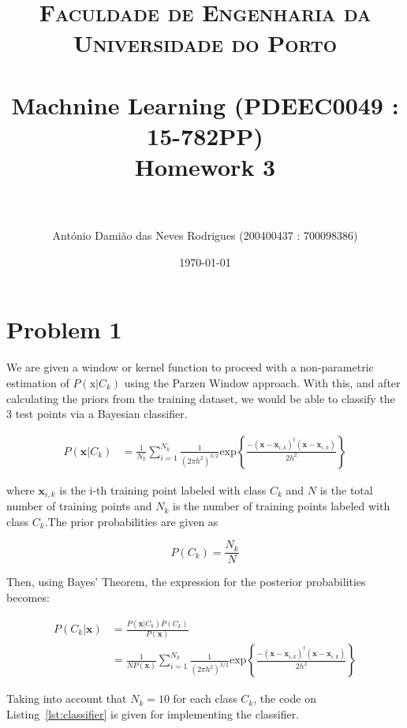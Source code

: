 \documentclass[paper=a4, fontsize=11pt]{scrartcl} %
\title{	
\normalfont \normalsize 
\textsc{Faculdade de Engenharia da Universidade do Porto} \\ [25pt] %
\horrule{0.5pt} \\[0.4cm] %
\LARGE Machnine Learning (PDEEC0049 : 15-782PP)\\ \Large Homework 3 \\ %
\horrule{2pt} \\[0.5cm] %
}
\author{António Damião das Neves Rodrigues (200400437 : 700098386)} %
\date{\normalsize\today} %
\numberwithin{equation}{section} %
\numberwithin{figure}{section} %
\numberwithin{table}{section} %
\newcommand{\vertbreak}{\vspace{1.75 mm}}
\begin{document}
\maketitle %

\section{Problem 1}

We are given a window or kernel function to proceed with a non-parametric 
estimation of $P(\text{x}|C_k)$ using the Parzen Window approach. With this, and 
after calculating the priors from the training dataset, we would be able to 
classify the 3 test points via a Bayesian classifier.\vertbreak

\begin{equation}
\begin{split}
    P(\textbf{x}|C_k) &= \frac{1}{N_k}\sum_{i=1}^{N_k}\frac{1}{(2\pi h^2)^{3/2}}\text{exp}\left\{\frac{-(\textbf{x} - \textbf{x}_{i,k})^t(\textbf{x} - \textbf{x}_{i,k})}{2h^2}\right\}
    \label{eq:1-1-cond}
\end{split}
\end{equation}

where $\textbf{x}_{i,k}$ is the i-th training point labeled with class $C_k$ and 
$N$ is the total number of training points and $N_k$ is the number of training 
points labeled with class $C_k$.\vertbreak The prior probabilities are given as 

\[P(C_k) = \frac{N_k}{N}\]

Then, using Bayes' Theorem, the expression for the posterior probabilities 
becomes: 

\begin{equation}
\begin{split}
    P(C_k|\textbf{x})   &= \frac{P(\textbf{x}|C_k)P(C_k)}{P(\textbf{x})}\\
                        &=\frac{1}{NP(\textbf{x})}\sum_{i=1}^{N_k}\frac{1}{(2\pi h^2)^{3/2}}\text{exp}\left\{\frac{-(\textbf{x} - \textbf{x}_{i,k})^t(\textbf{x} - \textbf{x}_{i,k})}{2h^2}\right\}
    \label{eq:1-1-posteriors}
\end{split}
\end{equation}

Taking into account that $N_k = 10$ for each class $C_k$, the code on 
Listing~\ref{lst:classifier} is given for implementing the classifier.
\end{document}
